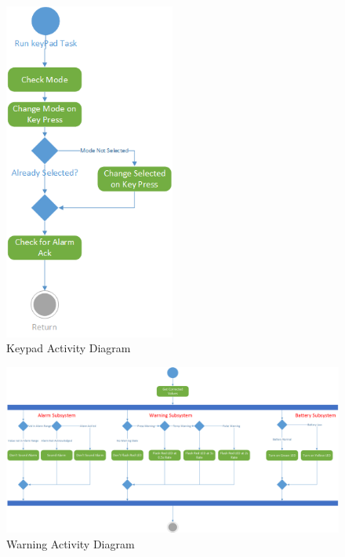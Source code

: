 \documentclass[12pt]{article} %
\begin{document}
    \begin{figure}[H]
      \centering
      \includegraphics[width=0.5\textwidth]{../design/KeyPad_activity.png}
      \caption{Keypad Activity Diagram}
      \label{fig:keyPadActivity}
    \end{figure}

    \begin{figure}[H]
      \centering
      \includegraphics[width=\textwidth]{../design/warning_activity.png}
      \caption{Warning Activity Diagram}
      \label{fig:warningActivity}
    \end{figure}
\end{document}
